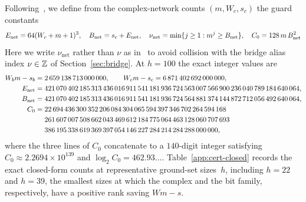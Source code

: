 Following~\cite[\S5.4]{OAI26}, we define from the complex-network counts $(m,W_c,s_c)$ the guard constants
\begin{equation}\label{eq:walsh-guard-constants}
  E_{\rm net}=64(W_c+m+1)^3,\quad B_{\rm net}=s_c+E_{\rm net},\quad
  \nu_{\mathrm{net}}=\min\{j\ge1:m^j\ge B_{\rm net}\},\quad C_0=128\,m\,B_{\rm net}^2
\end{equation}
Here we write $\nu_{\mathrm{net}}$ rather than $\nu$ as in~\cite[\S5.4]{OAI26} to avoid collision with the bridge alias index $\nu\in\mathbb{Z}$ of Section~\ref{sec:bridge}. At $h=100$ the exact integer values are
\begin{align*}
  W_bm-s_b&=2\,659\,138\,713\,000\,000,\qquad W_cm-s_c=6\,871\,402\,692\,000\,000,\\
  E_{\rm net}&=421\,070\,402\,185\,313\,436\,016\,911\,541\,181\,936\,724\,563\,007\,566\,900\,236\,040\,789\,184\,640\,064,\\
  B_{\rm net}&=421\,070\,402\,185\,313\,436\,016\,911\,541\,181\,936\,724\,564\,881\,374\,144\,872\,712\,056\,492\,640\,064,\\
  C_0&=22\,694\,436\,300\,352\,206\,084\,304\,065\,594\,397\,346\,702\,264\,594\,168\\
     &\phantom{{}={}}261\,607\,007\,508\,662\,043\,469\,612\,184\,775\,064\,463\,128\,060\,707\,693\\
     &\phantom{{}={}}386\,195\,338\,619\,369\,397\,054\,146\,227\,284\,214\,284\,288\,000\,000,
\end{align*}
where the three lines of $C_0$ concatenate to a $140$-digit integer satisfying $C_0\approx2.2694\times10^{139}$ and $\log_2C_0=462.93\ldots$. Table~\ref{app:cert-closed} records the exact closed-form counts at representative ground-set sizes~$h$, including $h=22$ and $h=39$, the smallest sizes at which the complex and the bit family, respectively, have a positive rank saving $Wm-s$.

